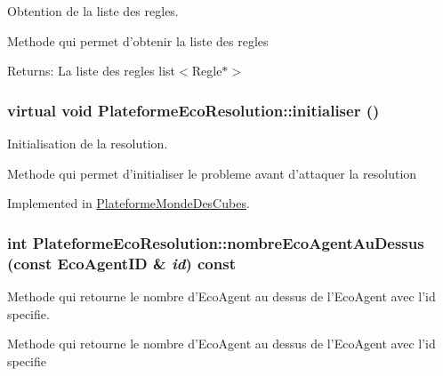 Obtention de la liste des regles. 

Methode qui permet d'obtenir la liste des regles

\begin{Desc}
\item[Returns:]La liste des regles list$<$Regle$\ast$$>$ \end{Desc}
\hypertarget{classPlateformeEcoResolution_57d87139f09ca51cd6a4fa7cd2e83351}{
\subsubsection[{initialiser}]{\setlength{\rightskip}{0pt plus 5cm}virtual void PlateformeEcoResolution::initialiser ()}}
\label{classPlateformeEcoResolution_57d87139f09ca51cd6a4fa7cd2e83351}


Initialisation de la resolution. 

Methode qui permet d'initialiser le probleme avant d'attaquer la resolution 

Implemented in \hyperlink{classPlateformeMondeDesCubes_67160be6f5ecd0b8f3fffeb1a7bd81ba}{PlateformeMondeDesCubes}.\hypertarget{classPlateformeEcoResolution_bccb426d9f1113e66b652bb63e7fafcd}{
\subsubsection[{nombreEcoAgentAuDessus}]{\setlength{\rightskip}{0pt plus 5cm}int PlateformeEcoResolution::nombreEcoAgentAuDessus (const {\bf EcoAgentID} \& {\em id}) const}}
\label{classPlateformeEcoResolution_bccb426d9f1113e66b652bb63e7fafcd}


Methode qui retourne le nombre d'EcoAgent au dessus de l'EcoAgent avec l'id specifie. 

Methode qui retourne le nombre d'EcoAgent au dessus de l'EcoAgent avec l'id specifie

